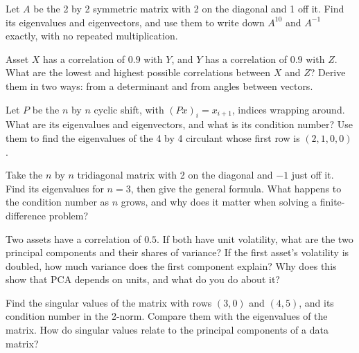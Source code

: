 \begin{question}\label{iq:iv1:linear-algebra:5}
Let $A$ be the 2 by 2 symmetric matrix with 2 on the diagonal and 1 off it. Find its eigenvalues and eigenvectors, and use them to write down $A^{10}$ and $A^{-1}$ exactly, with no repeated multiplication.
\end{question}

\begin{question}\label{iq:iv1:linear-algebra:6}
Asset $X$ has a correlation of $0.9$ with $Y$, and $Y$ has a correlation of $0.9$ with $Z$. What are the lowest and highest possible correlations between $X$ and $Z$? Derive them in two ways: from a determinant and from angles between vectors.
\end{question}

\begin{question}\label{iq:iv1:linear-algebra:7}
Let $P$ be the $n$ by $n$ cyclic shift, with $(Px)_i = x_{i + 1}$, indices wrapping around. What are its eigenvalues and eigenvectors, and what is its condition number? Use them to find the eigenvalues of the 4 by 4 circulant whose first row is $(2, 1, 0, 0)$.
\end{question}

\begin{question}\label{iq:iv1:linear-algebra:8}
Take the $n$ by $n$ tridiagonal matrix with 2 on the diagonal and $-1$ just off it. Find its eigenvalues for $n = 3$, then give the general formula. What happens to the condition number as $n$ grows, and why does it matter when solving a finite-difference problem?
\end{question}

\begin{question}\label{iq:iv1:linear-algebra:9}
Two assets have a correlation of $0.5$. If both have unit volatility, what are the two principal components and their shares of variance? If the first asset's volatility is doubled, how much variance does the first component explain? Why does this show that PCA depends on units, and what do you do about it?
\end{question}

\begin{question}\label{iq:iv1:linear-algebra:10}
Find the singular values of the matrix with rows $(3, 0)$ and $(4, 5)$, and its condition number in the 2-norm. Compare them with the eigenvalues of the matrix. How do singular values relate to the principal components of a data matrix?
\end{question}

